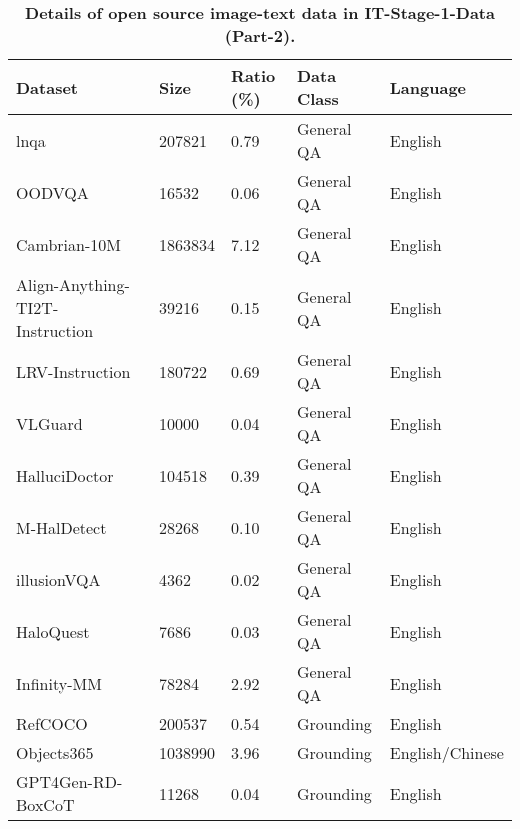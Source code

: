 \begin{table}[h]
\centering
\caption{\textbf{Details of open source image-text data in IT-Stage-1-Data (Part-2).}
}
\label{tab:appendix_sft_s1_it_2}
\setlength{\tabcolsep}{7pt}
\begin{tabular}{l|l|l|l|l}
\toprule
Dataset                         & Size    & Ratio (\%) & Data Class    & Language        \\
\midrule
lnqa~\cite{2020Connecting}                            & 207821  & 0.79     & General QA   & English         \\
OODVQA~\cite{0Benchmarking}                          & 16532    & 0.06     & General QA   & English         \\
Cambrian-10M~\cite{tong2024cambrian1}                    & 1863834 & 7.12     & General QA   & English         \\
Align-Anything-TI2T-Instruction~\cite{ji2024align} & 39216   & 0.15     & General QA   & English         \\
LRV-Instruction~\cite{liu2023aligning}                 & 180722  & 0.69     & General QA   & English         \\
VLGuard~\cite{zong2023safety}                         & 10000    & 0.04     & General QA   & English         \\
HalluciDoctor~\cite{yu2023hallucidoctor}                   & 104518   & 0.39     & General QA   & English         \\
M-HalDetect~\cite{gunjal2024detecting}                     & 28268   & 0.10     & General QA   & English         \\
illusionVQA~\cite{shahgir2024illusionvqa}                     & 4362    & 0.02     & General QA   & English         \\
HaloQuest~\cite{wang2024haloquest}                       & 7686    & 0.03     & General QA   & English         \\
Infinity-MM~\cite{gu2024infinitymm}                     & 78284   & 2.92     & General QA   & English         \\
RefCOCO~\cite{kazemzadeh2014referitgame}                         & 200537  & 0.54     & Grounding    & English         \\
Objects365~\cite{2020Objects365}                      & 1038990 & 3.96     & Grounding    & English/Chinese \\
GPT4Gen-RD-BoxCoT~\cite{chen2023shikra}               & 11268    & 0.04     & Grounding    & English         \\

\end{tabular}
\end{table}
